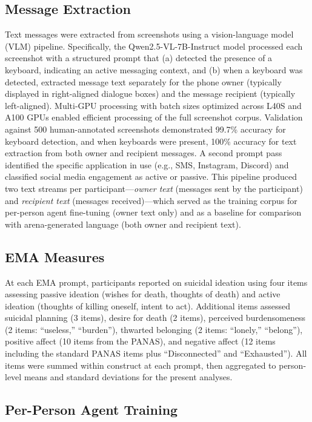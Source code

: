 \documentclass[review,12pt,authoryear]{elsarticle}
\begin{document}
\subsection{Message Extraction}

Text messages were extracted from screenshots using a vision-language model (VLM) pipeline. Specifically, the Qwen2.5-VL-7B-Instruct model \citep{qwen2025qwen3} processed each screenshot with a structured prompt that (a) detected the presence of a keyboard, indicating an active messaging context, and (b) when a keyboard was detected, extracted message text separately for the phone owner (typically displayed in right-aligned dialogue boxes) and the message recipient (typically left-aligned). Multi-GPU processing with batch sizes optimized across L40S and A100 GPUs enabled efficient processing of the full screenshot corpus. Validation against 500 human-annotated screenshots demonstrated 99.7\% accuracy for keyboard detection, and when keyboards were present, 100\% accuracy for text extraction from both owner and recipient messages. A second prompt pass identified the specific application in use (e.g., SMS, Instagram, Discord) and classified social media engagement as active or passive. This pipeline produced two text streams per participant---\textit{owner text} (messages sent by the participant) and \textit{recipient text} (messages received)---which served as the training corpus for per-person agent fine-tuning (owner text only) and as a baseline for comparison with arena-generated language (both owner and recipient text).

\subsection{EMA Measures}

At each EMA prompt, participants reported on suicidal ideation using four items assessing passive ideation (wishes for death, thoughts of death) and active ideation (thoughts of killing oneself, intent to act). Additional items assessed suicidal planning (3 items), desire for death (2 items), perceived burdensomeness (2 items: ``useless,'' ``burden''), thwarted belonging (2 items: ``lonely,'' ``belong''), positive affect (10 items from the PANAS), and negative affect (12 items including the standard PANAS items plus ``Disconnected'' and ``Exhausted''). All items were summed within construct at each prompt, then aggregated to person-level means and standard deviations for the present analyses.

\subsection{Per-Person Agent Training}
\end{document}
